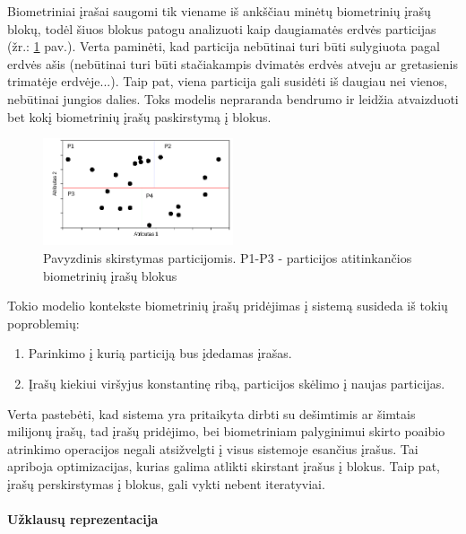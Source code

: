 Biometriniai įrašai saugomi tik viename iš ankščiau minėtų biometrinių įrašų blokų, todėl šiuos blokus patogu analizuoti kaip daugiamatės erdvės particijas (žr.: \ref{img:multidimensionalPartitionedGallery} pav.).
Verta paminėti, kad particija nebūtinai turi būti sulygiuota pagal erdvės ašis (nebūtinai turi būti stačiakampis dvimatės erdvės atveju ar gretasienis trimatėje erdvėje...).
Taip pat, viena particija gali susidėti iš daugiau nei vienos, nebūtinai jungios dalies.
Toks modelis nepraranda bendrumo ir leidžia atvaizduoti bet kokį biometrinių įrašų paskirstymą į blokus.

\begin{figure}[H]
\begin{center}
\includegraphics[width=0.5\textwidth]{img/MultidimensionalPartitionedGallery.png}
\caption{Pavyzdinis skirstymas particijomis. P1-P3 - particijos atitinkančios biometrinių įrašų blokus}
\label{img:multidimensionalPartitionedGallery}
\end{center}
\end{figure}

Tokio modelio kontekste biometrinių įrašų pridėjimas į sistemą susideda iš tokių poproblemių:
\begin{enumerate}
\item Parinkimo į kurią particiją bus įdedamas įrašas.
\item Įrašų kiekiui viršyjus konstantinę ribą, particijos skėlimo į naujas particijas.
\end{enumerate}

Verta pastebėti, kad sistema yra pritaikyta dirbti su dešimtimis ar šimtais milijonų įrašų, tad įrašų pridėjimo, bei biometriniam palyginimui skirto poaibio atrinkimo operacijos negali atsižvelgti į visus sistemoje esančius įrašus.
Tai apriboja optimizacijas, kurias galima atlikti skirstant įrašus į blokus.
Taip pat, įrašų perskirstymas į blokus, gali vykti nebent iteratyviai.

\paragraph{Užklausų reprezentacija}


